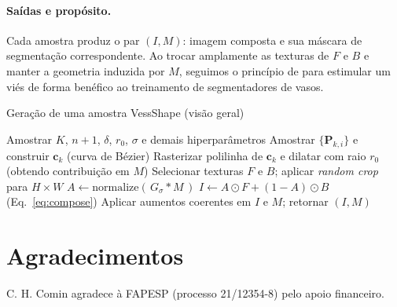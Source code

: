 \documentclass[%
reprint,
nofootinbib,
 amsmath,amssymb,
aps,
superscriptaddress,
showkeys,
longbibliography
]{revtex4-1}
\begin{document}
\paragraph*{Saídas e propósito.}
Cada amostra produz o par $(I, M)$: imagem composta e sua máscara de segmentação correspondente. Ao trocar amplamente as texturas de $F$ e $B$ e manter a geometria induzida por $M$, seguimos o princípio de \cite{geirhos2018} para estimular um viés de forma benéfico ao treinamento de segmentadores de vasos.

\begin{algorithm}[t]
\caption{Geração de uma amostra VessShape (visão geral)}
\begin{algorithmic}[1]
\State Amostrar $K$, $n{+}1$, $\delta$, $r_0$, $\sigma$ e demais hiperparâmetros
  \State Amostrar $\{\mathbf{P}_{k,i}\}$ e construir $\mathbf{c}_k$ (curva de Bézier)
  \State Rasterizar polilinha de $\mathbf{c}_k$ e dilatar com raio $r_0$ (obtendo contribuição em $M$)
\EndFor
\State Selecionar texturas $F$ e $B$; aplicar \emph{random crop} para $H\times W$
\State $A \gets \mathrm{normalize}(\,G_{\sigma} * M\,)$
\State $I \gets A \odot F + (1-A) \odot B$ \hfill (Eq.~\ref{eq:compose})
\State Aplicar aumentos coerentes em $I$ e $M$; retornar $(I, M)$
\end{algorithmic}
\end{algorithm}

\section*{Agradecimentos}
C. H. Comin agradece à FAPESP (processo 21/12354-8) pelo apoio financeiro.


\end{document}
